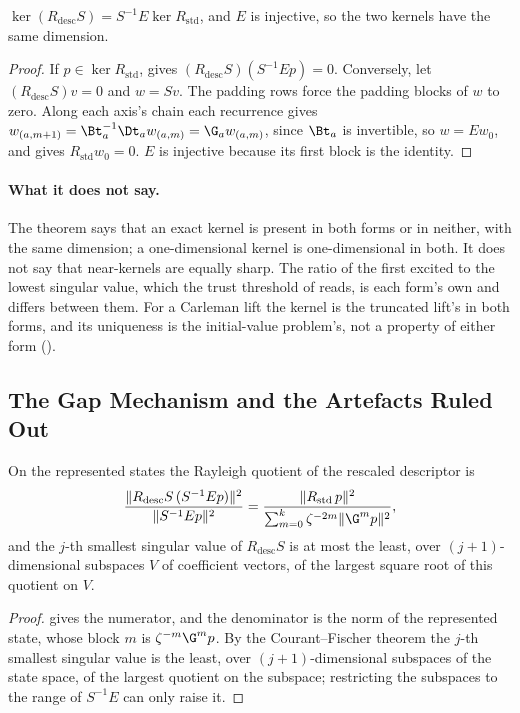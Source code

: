 \begin{theorem}
\label{thm:kernel-equivalence-general}
$\ker(R_{\mathrm{desc}}S)=S^{-1}E\ker R_{\mathrm{std}}$, and $E$ is injective, so the two kernels have the same dimension.
\end{theorem}
\begin{proof}
If $p\in\ker R_{\mathrm{std}}$,  gives $(R_{\mathrm{desc}}S)(S^{-1}Ep)=0$. Conversely, let $(R_{\mathrm{desc}}S)v=0$ and $w=Sv$. The padding rows force the padding blocks of $w$ to zero. Along each axis's chain each recurrence gives $w_{(a,m+1)}=\Bt_a^{-1}\Dt_aw_{(a,m)}=\G_aw_{(a,m)}$, since $\Bt_a$ is invertible, so $w=Ew_0$, and  gives $R_{\mathrm{std}}w_0=0$. $E$ is injective because its first block is the identity.
\end{proof}

\paragraph{What it does not say.} The theorem says that an exact kernel is present in both forms or in neither, with the same dimension; a one-dimensional kernel is one-dimensional in both. It does not say that near-kernels are equally sharp. The ratio of the first excited to the lowest singular value, which the trust threshold of  reads, is each form's own and differs between them. For a Carleman lift the kernel is the truncated lift's in both forms, and its uniqueness is the initial-value problem's, not a property of either form ().

\subsection{The Gap Mechanism and the Artefacts Ruled Out}
\label{app:descriptor-gap}

\begin{proposition}
\label{prop:descriptor-quotient}
On the represented states the Rayleigh quotient of the rescaled descriptor is
\begin{equation}
    \frac{\|R_{\mathrm{desc}}S\,(S^{-1}Ep)\|^2}{\|S^{-1}Ep\|^2}
    =\frac{\|R_{\mathrm{std}}\,p\|^2}{\sum_{m=0}^{k}\zeta^{-2m}\|\G^mp\|^2},
\end{equation}
and the $j$-th smallest singular value of $R_{\mathrm{desc}}S$ is at most the least, over $(j+1)$-dimensional subspaces $V$ of coefficient vectors, of the largest square root of this quotient on $V$.
\end{proposition}
\begin{proof}
 gives the numerator, and the denominator is the norm of the represented state, whose block $m$ is $\zeta^{-m}\G^mp$. By the Courant--Fischer theorem the $j$-th smallest singular value is the least, over $(j+1)$-dimensional subspaces of the state space, of the largest quotient on the subspace; restricting the subspaces to the range of $S^{-1}E$ can only raise it.
\end{proof}


